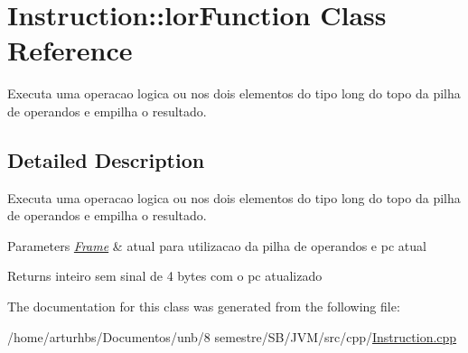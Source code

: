 \hypertarget{classInstruction_1_1lorFunction}{}\section{Instruction\+:\+:lor\+Function Class Reference}
\label{classInstruction_1_1lorFunction}


Executa uma operacao logica \textquotesingle{}ou\textquotesingle{} nos dois elementos do tipo long do topo da pilha de operandos e empilha o resultado.  




\subsection{Detailed Description}
Executa uma operacao logica \textquotesingle{}ou\textquotesingle{} nos dois elementos do tipo long do topo da pilha de operandos e empilha o resultado. 


\begin{DoxyParams}{Parameters}
{\em \hyperlink{classFrame}{Frame}} & atual para utilizacao da pilha de operandos e pc atual \\
\hline
\end{DoxyParams}
\begin{DoxyReturn}{Returns}
inteiro sem sinal de 4 bytes com o pc atualizado 
\end{DoxyReturn}


The documentation for this class was generated from the following file\+:\begin{DoxyCompactItemize}
\item 
/home/arturhbs/\+Documentos/unb/8 semestre/\+S\+B/\+J\+V\+M/src/cpp/\hyperlink{Instruction_8cpp}{Instruction.\+cpp}\end{DoxyCompactItemize}
